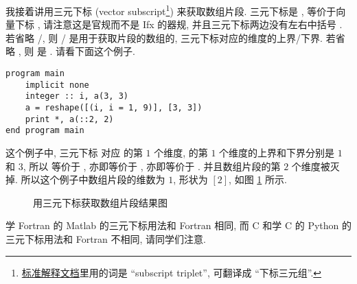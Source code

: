 我接着讲用三元下标 (vector subscript\footnote{\href{https://j3-fortran.org/doc/year/24/24-007.pdf}{标准解释文档}里用的词是 ``subscript triplet'', 可翻译成 ``下标三元组''.}) 来获取数组片段. 三元下标是 , 等价于向量下标 \ttt{[(i, i = m1, m2, m3)]}, 请注意这是官规而不是 Ifx 的器规, 并且三元下标两边没有左右中括号 \ttt{[]}. 若省略 /, 则 / 是用于获取片段的数组的, 三元下标对应的维度的上界/下界. 若省略 , 则  是 . 请看下面这个例子.
\begin{lstlisting}
program main
    implicit none
    integer :: i, a(3, 3)
    a = reshape([(i, i = 1, 9)], [3, 3])
    print *, a(::2, 2)
end program main
\end{lstlisting}
这个例子中, 三元下标  对应  的第 $1$ 个维度,  的第 $1$ 个维度的上界和下界分别是 $1$ 和 $3$, 所以  等价于 , 亦即等价于 \ttt{[(i, i = 1, 3, 2)]}, 亦即等价于 \ttt{[1, 3]}. 并且数组片段的第 $2$ 个维度被灭掉. 所以这个例子中数组片段的维数为 $1$, 形状为 $[2]$, 如图 \ref{a_section__example_3} 所示.
\begin{figure}[htbp]
    \centering
    \caption{用三元下标获取数组片段结果图}
    \label{a_section__example_3}
\end{figure}
学 Fortran 的 Matlab 的三元下标用法和 Fortran 相同, 而 C 和学 C 的 Python 的三元下标用法和 Fortran 不相同, 请同学们注意.

